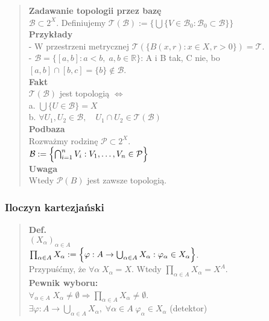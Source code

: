 \documentclass[10pt,a4paper]{article}
\begin{document}
{\begin{quote}
    \textbf{Zadawanie topologii przez bazę} \\
    $\mathcal{B} \subset 2^X$. Definiujemy $\mathcal{T}(\mathcal{B}) := \{\bigcup \{V \in \mathcal{B}_0 : \mathcal{B}_0 \subset \mathcal{B}\}\}$\\

    \textbf{Przykłady}\\
    - W przestrzeni metrycznej $\mathcal{T}(\{B(x,r) : x \in X, r > 0\}) = \mathcal{T}$.\\
    - $\mathcal{B} = \{[a,b] : a < b,\; a,b \in \mathbb{R}\}$: A i B tak, C nie,  bo $[a,b] \cap [b,c] = \{b\} \notin \mathcal{B}$.\\
    
    \textbf{Fakt}\\
    $\mathcal{T}(\mathcal{B})$ jest topologią $\Leftrightarrow$\\
    a. $\bigcup \{U \in \mathcal{B}\} = X$\\
    b. $\forall U_1, U_2 \in \mathcal{B}, \quad U_1 \cap U_2 \in \mathcal{T}(\mathcal{B})$\\

    \textbf{Podbaza}\\
    Rozważmy rodzinę $\mathcal{P} \subset 2^X$.\\
    $\mathcal{B} := \Bigl\{ \bigcap_{i=1}^n V_i : V_1, \dots, V_n \in \mathcal{P} \Bigr\}$\\

    \textbf{Uwaga}\\
    Wtedy $\mathcal{P}(B)$ jest zawsze topologią.
    \end{quote}

    \subsubsection*{Iloczyn kartezjański}
    \begin{quote}
    \textbf{Def.}\\
    $(X_\alpha)_{\alpha \in A}$\\[4pt]
    $\prod_{\alpha \in A} X_\alpha := \Bigl\{ \varphi : A \to \bigcup_{\alpha \in A} X_\alpha : \varphi_\alpha \in X_\alpha \Bigr\}$.\\[6pt]
    Przypuśćmy, że $\forall \alpha\; X_\alpha = X$. Wtedy $\prod_{\alpha \in A} X_\alpha = X^A$.\\[8pt]
    \textbf{Pewnik wyboru:}\\
    $\forall_{\alpha \in A} \; X_\alpha \neq \emptyset \Rightarrow \prod_{\alpha \in A} X_\alpha \neq \emptyset$.\\[6pt]
    $\exists \varphi : A \to \bigcup_{\alpha \in A} X_\alpha,\; \forall \alpha \in A\; \varphi_\alpha \in X_\alpha$ (detektor)
    \end{quote}


}
\end{document}
